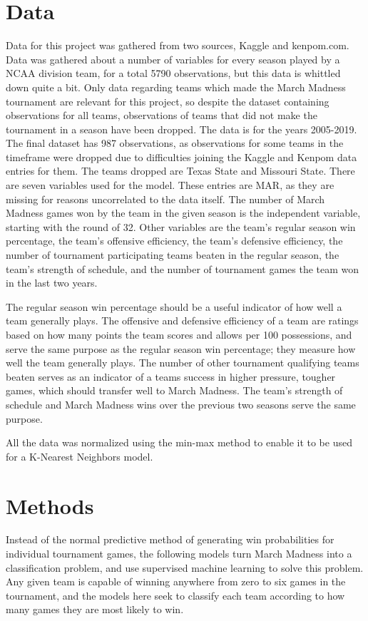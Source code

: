 \documentclass{article}
\begin{document}
\section{Data}
Data for this project was gathered from two sources, Kaggle and kenpom.com. Data was gathered about a number of variables for every season played by a NCAA division team, for a total 5790 observations, but this data is whittled down quite a bit. Only data regarding teams which made the March Madness tournament are relevant for this project, so despite the dataset containing observations for all teams, observations of teams that did not make the tournament in a season have been dropped. The data is for the years 2005-2019. The final dataset has 987 observations, as observations for some teams in the timeframe were dropped due to difficulties joining the Kaggle and Kenpom data entries for them. The teams dropped are Texas State and Missouri State. There are seven variables used for the model. These entries are MAR, as they are missing for reasons uncorrelated to the data itself. The number of March Madness games won by the team in the given season is the independent variable, starting with the round of 32. Other variables are the team's regular season win percentage, the team's offensive efficiency, the team's defensive efficiency, the number of tournament participating teams beaten in the regular season, the team's strength of schedule, and the number of tournament games the team won in the last two years. 

The regular season win percentage should be a useful indicator of how well a team generally plays. The offensive and defensive efficiency of a team are ratings based on how many points the team scores and allows per 100 possessions, and serve the same purpose as the regular season win percentage; they measure how well the team generally plays. The number of other tournament qualifying teams beaten serves as an indicator of a teams success in higher pressure, tougher games, which should transfer well to March Madness. The team's strength of schedule and March Madness wins over the previous two seasons serve the same purpose. 

All the data was normalized using the min-max method to enable it to be used for a K-Nearest Neighbors model. 

\section{Methods}
Instead of the normal predictive method of generating win probabilities for individual tournament games, the following models turn March Madness into a classification problem, and use supervised machine learning to solve this problem. Any given team is capable of winning anywhere from zero to six games in the tournament, and the models here seek to classify each team according to how many games they are most likely to win. 
\end{document}
